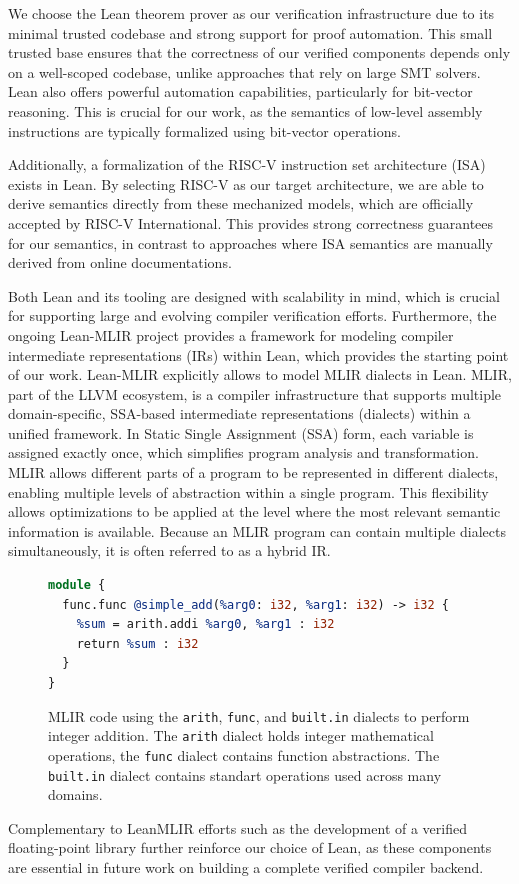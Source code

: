 We choose the Lean theorem prover as our verification infrastructure due to its minimal trusted codebase and strong support for proof automation. This small trusted base ensures that the correctness of our verified components depends only on a well-scoped codebase, unlike approaches that rely on large SMT solvers. Lean also offers powerful automation capabilities, particularly for bit-vector reasoning. This is crucial for our work, as the semantics of low-level assembly instructions are typically formalized using bit-vector operations.

Additionally, a formalization of the RISC-V instruction set architecture (ISA) exists in Lean. By selecting RISC-V as our target architecture, we are able to derive semantics directly from these mechanized models, which are officially accepted by RISC-V International. This provides strong correctness guarantees for our semantics, in contrast to approaches where ISA semantics are manually derived from online documentations.

Both Lean and its tooling are designed with scalability in mind, which is crucial for supporting large and evolving compiler verification efforts. Furthermore, the ongoing Lean-MLIR project provides a framework for modeling compiler intermediate representations (IRs) within Lean, which provides the starting point of our work. Lean-MLIR explicitly allows to model MLIR dialects in Lean.
MLIR, part of the LLVM ecosystem, is a compiler infrastructure that supports multiple domain-specific, SSA-based intermediate representations (dialects) within a unified framework. In Static Single Assignment (SSA) form, each variable is assigned exactly once, which simplifies program analysis and transformation. MLIR allows different parts of a program to be represented in different dialects, enabling multiple levels of abstraction within a single program. This flexibility allows optimizations to be applied at the level where the most relevant semantic information is available. Because an MLIR program can contain multiple dialects simultaneously, it is often referred to as a hybrid IR.
\begin{figure}[ht]
\centering
\begin{lstlisting}[language=LLVM, basicstyle=\ttfamily\small]
module {
  func.func @simple_add(%arg0: i32, %arg1: i32) -> i32 {
    %sum = arith.addi %arg0, %arg1 : i32
    return %sum : i32
  }
}

\end{lstlisting}
\caption{ MLIR code using the \texttt{arith}, \texttt{func},  and \texttt{built.in} dialects to perform integer addition. The \texttt{arith} dialect holds integer mathematical operations, the \texttt{func} dialect contains function abstractions. The \texttt{built.in} dialect contains standart operations used across many domains.}
\label{fig:mlir-addition}
\end{figure}
Complementary to LeanMLIR efforts such as the development of a verified floating-point library further reinforce our choice of Lean, as these components are essential in future work on building a complete verified compiler backend.

